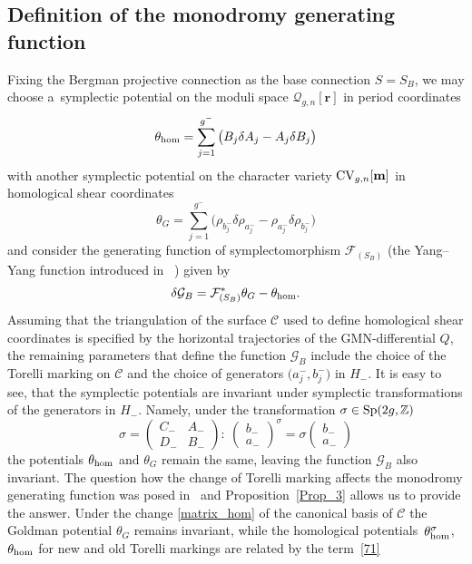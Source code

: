 \documentclass[pdftex]{sigma}
\numberwithin{equation}{section}
\theoremstyle{definition}
\newcommand{\Z}{\mathbb{Z}}
\begin{document}
\subsection{Definition of the monodromy generating function}
Fixing the Bergman projective connection as the base connection $S=S_B$, we may choose a~symplectic potential on the moduli space $\mathcal{Q}_{g,n}[\mathbf{r}]$ in period coordinates
\begin{equation}\label{pot_hom}\theta_{{\rm hom}}=\sum^{g^-}_{j=1} \big(B_j \delta A_j - A_j \delta B_j \big)\end{equation}
with another symplectic potential on the character variety ${\rm CV}_{g,n}[\mathbf{m}]$ in homological shear coordinates
\begin{equation}\label{pot_G}
\theta_{G}=\sum^{g^-}_{j=1}\big( \rho_{b^-_j} \delta \rho_{a^-_j} - \rho_{a^-_j} \delta \rho_{b^-_j} \big)
\end{equation}
and consider the generating function of symplectomorphism $\mathcal{F}_{(S_B)}$ (the Yang--Yang function introduced in~\cite{nekrasov} ) given by
 \begin{equation} \label{yang_1}
 \delta \mathcal{G}_{B}=\mathcal{F}_{(S_B)}^*\theta_{G}-\theta_{{\rm hom}}.
 \end{equation}
Assuming that the triangulation of the surface $\mathcal{C}$ used to define homological shear coordinates is specified by the horizontal trajectories of the GMN-differential $Q$, the remaining parameters that define the function $\mathcal{G}_{B}$ include the choice of the Torelli marking on $\mathcal{C}$ and the choice of generators $\big(a^-_j,b^-_j\big)$ in $H_{-}.$ It is easy to see, that the symplectic potentials are invariant under symplectic transformations of the generators in $H_{-}$. Namely, under the transformation $\sigma \in {\rm Sp}(2g,\Z)$
\begin{equation*}
\sigma=\begin{pmatrix}
C_- & A_- \\
D_- & B_-
\end{pmatrix}\colon \
\begin{pmatrix}
b_- \\
a_-
\end{pmatrix}^{\sigma}= \sigma
\begin{pmatrix}
b_- \\
a_-
\end{pmatrix}
\end{equation*}
the potentials $\theta_{{\rm hom}}$ and $\theta_{G}$ remain the same, leaving the function $\mathcal{G}_B$ also invariant. The question how the change of Torelli marking affects the monodromy generating function was posed in~\cite{bertola2021wkb} and Proposition~\ref{Prop_3} allows us to provide the answer. Under the change \eqref{matrix_hom} of the canonical basis of $\mathcal{C}$ the Goldman potential $\theta_G$ remains invariant, while the homological potentials~$\theta^{\sigma}_{{\rm hom}}$,~$\theta_{{\rm hom}}$ for new and old Torelli markings are related by the term~\eqref{71}
\end{document}
